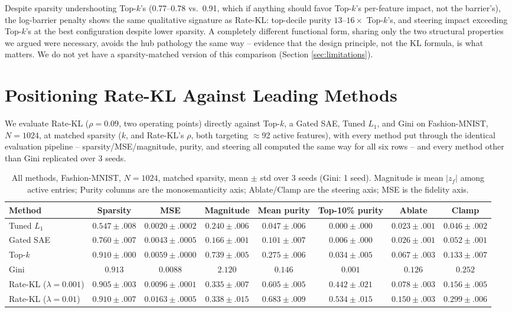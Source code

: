 \documentclass[11pt,twocolumn]{article}
\begin{document}
Despite sparsity undershooting Top-$k$'s (0.77--0.78 vs.\ 0.91, which if anything should favor Top-$k$'s per-feature impact, not the barrier's), the log-barrier penalty shows the same qualitative signature as Rate-KL: top-decile purity $13$--$16\times$ Top-$k$'s, and steering impact exceeding Top-$k$'s at the best configuration despite lower sparsity. A completely different functional form, sharing only the two structural properties we argued were necessary, avoids the hub pathology the same way -- evidence that the design principle, not the KL formula, is what matters. We do not yet have a sparsity-matched version of this comparison (Section \ref{sec:limitations}).

\section{Positioning Rate-KL Against Leading Methods}
\label{sec:positioning}
We evaluate Rate-KL ($\rho{=}0.09$, two operating points) directly against Top-$k$, a Gated SAE, Tuned $L_1$, and Gini on Fashion-MNIST, $N{=}1024$, at matched sparsity ($k$, and Rate-KL's $\rho$, both targeting $\approx$92 active features), with every method put through the identical evaluation pipeline -- sparsity/MSE/magnitude, purity, and steering all computed the same way for all six rows -- and every method other than Gini replicated over 3 seeds.

\begin{table}[t]
\centering
\caption{All methods, Fashion-MNIST, $N{=}1024$, matched sparsity, mean $\pm$ std over 3 seeds (Gini: 1 seed). Magnitude is mean $|z_f|$ among active entries; Purity columns are the monosemanticity axis; Ablate/Clamp are the steering axis; MSE is the fidelity axis.}
\label{tab:positioning}
\begin{tabular}{@{}lccccccc@{}}
\toprule
Method & Sparsity & MSE & Magnitude & Mean purity & Top-10\% purity & Ablate & Clamp \\ \midrule
Tuned $L_1$ & $0.547{\pm}.008$ & $\mathbf{0.0020{\pm}.0002}$ & $0.240{\pm}.006$ & $0.047{\pm}.006$ & $0.000{\pm}.000$ & $0.023{\pm}.001$ & $0.046{\pm}.002$ \\
Gated SAE & $0.760{\pm}.007$ & $0.0043{\pm}.0005$ & $0.166{\pm}.001$ & $0.101{\pm}.007$ & $0.006{\pm}.000$ & $0.026{\pm}.001$ & $0.052{\pm}.001$ \\
Top-$k$ & $0.910{\pm}.000$ & $0.0059{\pm}.0000$ & $\mathbf{0.739{\pm}.005}$ & $0.275{\pm}.006$ & $0.034{\pm}.005$ & $0.067{\pm}.003$ & $0.133{\pm}.007$ \\
Gini & $0.913$ & $0.0088$ & $2.120$ & $0.146$ & $0.001$ & $0.126$ & $0.252$ \\
Rate-KL ($\lambda{=}0.001$) & $0.905{\pm}.003$ & $0.0096{\pm}.0001$ & $0.335{\pm}.007$ & $0.605{\pm}.005$ & $0.442{\pm}.021$ & $0.078{\pm}.003$ & $0.156{\pm}.005$ \\
Rate-KL ($\lambda{=}0.01$) & $0.910{\pm}.007$ & $0.0163{\pm}.0005$ & $0.338{\pm}.015$ & $\mathbf{0.683{\pm}.009}$ & $\mathbf{0.534{\pm}.015}$ & $\mathbf{0.150{\pm}.003}$ & $\mathbf{0.299{\pm}.006}$ \\ \bottomrule
\end{tabular}
\end{table}
\end{document}
